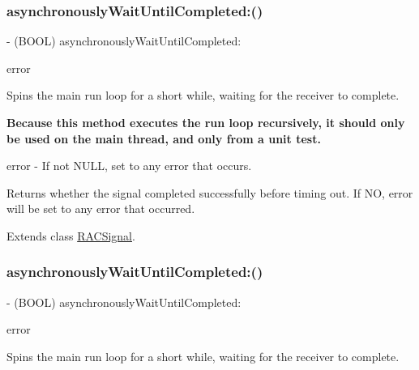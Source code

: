 \subsubsection{\texorpdfstring{asynchronously\+Wait\+Until\+Completed\+:()}{asynchronouslyWaitUntilCompleted:()}\hspace{0.1cm}{\footnotesize\ttfamily [2/3]}}
{\footnotesize\ttfamily -\/ (B\+O\+OL) asynchronously\+Wait\+Until\+Completed\+: \begin{DoxyParamCaption}\item[{(N\+S\+Error $\ast$$\ast$)}]{error }\end{DoxyParamCaption}}

Spins the main run loop for a short while, waiting for the receiver to complete.

{\bfseries Because this method executes the run loop recursively, it should only be used on the main thread, and only from a unit test.}

error -\/ If not N\+U\+LL, set to any error that occurs.

Returns whether the signal completed successfully before timing out. If NO, {\ttfamily error} will be set to any error that occurred. 

Extends class \mbox{\hyperlink{interface_r_a_c_signal_a29ac4be53792963e1c7e5c59e545e6cd}{R\+A\+C\+Signal}}.

\mbox{\label{category_r_a_c_signal_07_testing_08_a29ac4be53792963e1c7e5c59e545e6cd}} 
\subsubsection{\texorpdfstring{asynchronously\+Wait\+Until\+Completed\+:()}{asynchronouslyWaitUntilCompleted:()}\hspace{0.1cm}{\footnotesize\ttfamily [3/3]}}
{\footnotesize\ttfamily -\/ (B\+O\+OL) asynchronously\+Wait\+Until\+Completed\+: \begin{DoxyParamCaption}\item[{(N\+S\+Error $\ast$$\ast$)}]{error }\end{DoxyParamCaption}}

Spins the main run loop for a short while, waiting for the receiver to complete.

